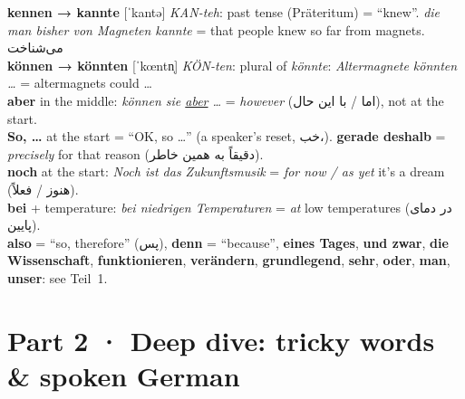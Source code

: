 \documentclass[10pt]{article}
\newcommand{\fa}[1]{{\farsifont\beginR #1\endR}}
\begin{document}
\begin{tcolorbox}[colback=dasc!8,colframe=dasc,boxrule=0.6pt,arc=1mm,title={\textbf{Already in Teil 1 — and what is new about them here}}]
\small
\textbf{kennen → kannte} [ˈkantə] \emph{KAN-teh}: past tense (Präteritum) = “knew”. \emph{die man bisher von Magneten kannte} = that people knew so far from magnets. \fa{می‌شناخت}\\
\textbf{können → könnten} [ˈkœntn̩] \emph{KÖN-ten}: plural of \emph{könnte}: \emph{Altermagnete könnten …} = altermagnets could …\\
\textbf{aber} in the middle: \emph{können sie \underline{aber} …} = \emph{however} (\fa{اما / با این حال}), not at the start.\\
\textbf{So, …} at the start = “OK, so …” (a speaker’s reset, \fa{خب،}). \textbf{gerade deshalb} = \emph{precisely} for that reason (\fa{دقیقاً به همین خاطر}).\\
\textbf{noch} at the start: \emph{Noch ist das Zukunftsmusik} = \emph{for now / as yet} it’s a dream (\fa{هنوز / فعلاً}).\\
\textbf{bei} + temperature: \emph{bei niedrigen Temperaturen} = \emph{at} low temperatures (\fa{در دمای پایین}).\\
\textbf{also} = “so, therefore” (\fa{پس}), \textbf{denn} = “because”, \textbf{eines Tages}, \textbf{und zwar}, \textbf{die Wissenschaft}, \textbf{funktionieren}, \textbf{verändern}, \textbf{grundlegend}, \textbf{sehr}, \textbf{oder}, \textbf{man}, \textbf{unser}: see Teil~1.
\end{tcolorbox}

\newpage
\section*{Part 2 · Deep dive: tricky words \& spoken German}
\end{document}
